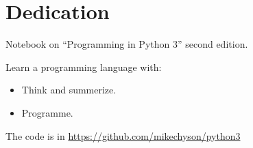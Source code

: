 \chapter*{Dedication}

Notebook on ``Programming in Python 3'' second edition.


Learn a programming language with:
\begin{itemize}
\item Think and summerize.
\item Programme.
\end{itemize}


The code is in \url{https://github.com/mikechyson/python3}


